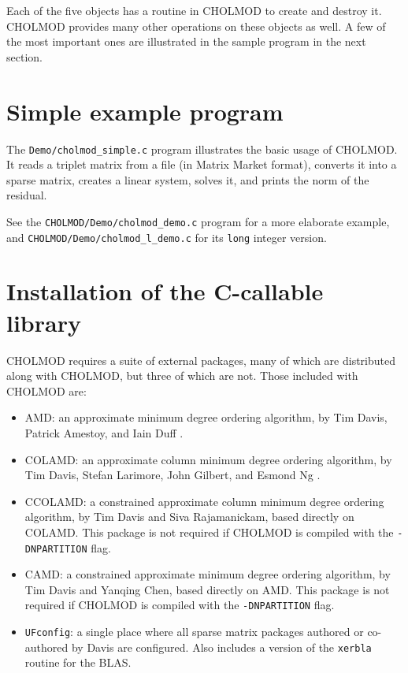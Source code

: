 \documentclass[11pt]{article}
\begin{document}
Each of the five objects has a routine in CHOLMOD to create and destroy it.
CHOLMOD provides many other operations on these objects as well.
A few of the most important ones are illustrated in the sample program in the
next section.

\newpage \section{Simple example program}


The {\tt Demo/cholmod\_simple.c} program illustrates the
basic usage of CHOLMOD.  It reads a triplet matrix from a file
(in Matrix Market format), converts it into a sparse matrix,
creates a linear system, solves it, and prints the norm of the residual.

See the {\tt CHOLMOD/Demo/cholmod\_demo.c} program for a more elaborate
example, and \newline
{\tt CHOLMOD/Demo/cholmod\_l\_demo.c} for its {\tt long} integer version.

\newpage \section{Installation of the C-callable library}
\label{Install}

CHOLMOD requires a suite of external packages, many of which are distributed
along with CHOLMOD, but three of which are not.  Those included with CHOLMOD are:
\begin{itemize}
\item AMD: an approximate minimum degree ordering algorithm,
    by Tim Davis, Patrick Amestoy, and Iain Duff
    \cite{AmestoyDavisDuff96,AmestoyDavisDuff03}.
\item COLAMD: an approximate column minimum degree ordering algorithm,
    by Tim Davis, Stefan Larimore, John Gilbert, and Esmond Ng
    \cite{DavisGilbertLarimoreNg00_algo,DavisGilbertLarimoreNg00}.
\item CCOLAMD: a constrained approximate column minimum degree ordering
    algorithm,
    by Tim Davis and Siva Rajamanickam, based directly on COLAMD.
    This package is not required if CHOLMOD is compiled with the
    {\tt -DNPARTITION} flag.
\item CAMD: a constrained approximate minimum degree ordering
    algorithm,
    by Tim Davis and Yanqing Chen, based directly on AMD.
    This package is not required if CHOLMOD is compiled with the
    {\tt -DNPARTITION} flag.
\item {\tt UFconfig}: a single place where all sparse matrix packages authored
    or co-authored by Davis are configured.  Also includes a version of the
    {\tt xerbla} routine for the BLAS.
\end{itemize}
\end{document}
